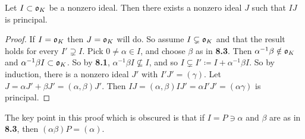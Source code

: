 \documentclass[10pt,a4paper]{article}
\begin{document}
\begin{theorem}
Let $I \subset \mathfrak{o}_K$ be a nonzero ideal. Then there exists a nonzero ideal $J$ such that $IJ$ is principal.
\end{theorem}
\begin{proof}
If $I = \mathfrak{o}_K$ then $J = \mathfrak{o}_K$ will do. So assume $I \subsetneq \mathfrak{o}_K$ and that the result holds for every $I' \supsetneq I$. Pick $0 \neq \alpha \in I$, and choose $\beta$ as in \textbf{8.3}. Then $\alpha^{-1}\beta \notin \mathfrak{o}_K$ and $\alpha^{-1}\beta I \subset \mathfrak{o}_K$. So by \textbf{8.1}, $\alpha^{-1}\beta I \nsubseteq I$, and so $I \subsetneq I' \coloneqq I + \alpha^{-1}\beta I$. So by induction, there is a nonzero ideal $J'$ with $I'J' = (\gamma)$. Let $J = \alpha J' + \beta J' = (\alpha, \beta)J'$. Then $IJ = (\alpha, \beta) I J' = \alpha I' J' = (\alpha\gamma)$ is principal.
\end{proof}
The key point in this proof which is obscured is that if $I = P \ni \alpha$ and $\beta$ are as in \textbf{8.3}, then $(\alpha \beta)P = (\alpha)$.
\end{document}
